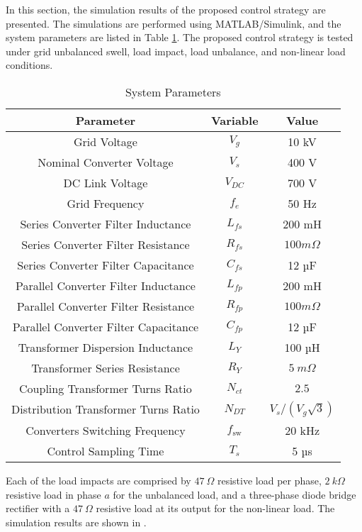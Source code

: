 
In this section, the simulation results of the proposed control strategy are presented. The simulations are performed using MATLAB/Simulink, and the system parameters are listed in Table \ref{tab:params}. The proposed control strategy is tested under grid unbalanced swell, load impact, load unbalance, and non-linear load conditions.

\begin{table}[h!]
    \centering
    \caption{System Parameters}
    \begin{tabular}{|c|c|c|}
        \hline
        Parameter & Variable & Value \\
        \hline
        \hline
        Grid Voltage & $V_{g}$ & 10 kV \\
        Nominal Converter Voltage & $V_s$ & 400 V \\
        DC Link Voltage & $V_{DC}$ & 700 V \\
        Grid Frequency & $f_e$ & 50 Hz \\
        Series Converter Filter Inductance & $L_{fs}$ & 200 mH \\
        Series Converter Filter Resistance & $R_{fs}$ & $100 m\Omega$ \\
        Series Converter Filter Capacitance & $C_{fs}$ & 12 µF \\
        Parallel Converter Filter Inductance & $L_{fp}$ & 200 mH \\
        Parallel Converter Filter Resistance & $R_{fp}$ & $100 m\Omega$ \\
        Parallel Converter Filter Capacitance & $C_{fp}$ & 12 µF \\
        Transformer Dispersion Inductance & $L_Y$ & 100 µH \\
        Transformer Series Resistance & $R_Y$ & $5\ m\Omega$\\
        Coupling Transformer Turns Ratio & $N_{ct}$ & $2.5$ \\
        Distribution Transformer Turns Ratio & $N_{DT}$ & $V_s/(V_g\sqrt{3})$ \\
        Converters Switching Frequency & $f_{\text{sw}}$ & 20 kHz \\
        Control Sampling Time & $T_s$ & 5 µs \\
        \hline
    \end{tabular}
    \label{tab:params}
\end{table}

Each of the load impacts are comprised by $47\ \Omega$ resistive load per phase, $2\ k\Omega$ resistive load in phase $a$ for the unbalanced load, and a three-phase diode bridge rectifier with a $47\ \Omega$ resistive load at its output for the non-linear load. The simulation results are shown in .

